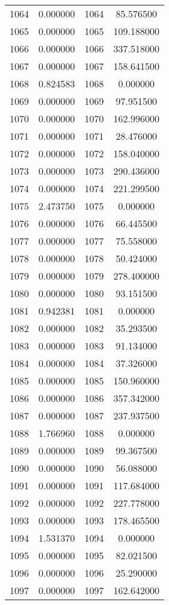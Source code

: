 \documentclass[12pt]{article}
\begin{document}
\begin{longtable}{@{}cccc@{}}
1064 & 0.000000 & 1064 & 85.576500 \\
1065 & 0.000000 & 1065 & 109.188000 \\
1066 & 0.000000 & 1066 & 337.518000 \\
1067 & 0.000000 & 1067 & 158.641500 \\
1068 & 0.824583 & 1068 & 0.000000 \\
1069 & 0.000000 & 1069 & 97.951500 \\
1070 & 0.000000 & 1070 & 162.996000 \\
1071 & 0.000000 & 1071 & 28.476000 \\
1072 & 0.000000 & 1072 & 158.040000 \\
1073 & 0.000000 & 1073 & 290.436000 \\
1074 & 0.000000 & 1074 & 221.299500 \\
1075 & 2.473750 & 1075 & 0.000000 \\
1076 & 0.000000 & 1076 & 66.445500 \\
1077 & 0.000000 & 1077 & 75.558000 \\
1078 & 0.000000 & 1078 & 50.424000 \\
1079 & 0.000000 & 1079 & 278.400000 \\
1080 & 0.000000 & 1080 & 93.151500 \\
1081 & 0.942381 & 1081 & 0.000000 \\
1082 & 0.000000 & 1082 & 35.293500 \\
1083 & 0.000000 & 1083 & 91.134000 \\
1084 & 0.000000 & 1084 & 37.326000 \\
1085 & 0.000000 & 1085 & 150.960000 \\
1086 & 0.000000 & 1086 & 357.342000 \\
1087 & 0.000000 & 1087 & 237.937500 \\
1088 & 1.766960 & 1088 & 0.000000 \\
1089 & 0.000000 & 1089 & 99.367500 \\
1090 & 0.000000 & 1090 & 56.088000 \\
1091 & 0.000000 & 1091 & 117.684000 \\
1092 & 0.000000 & 1092 & 227.778000 \\
1093 & 0.000000 & 1093 & 178.465500 \\
1094 & 1.531370 & 1094 & 0.000000 \\
1095 & 0.000000 & 1095 & 82.021500 \\
1096 & 0.000000 & 1096 & 25.290000 \\
1097 & 0.000000 & 1097 & 162.642000 \\

\end{longtable}
\end{document}
